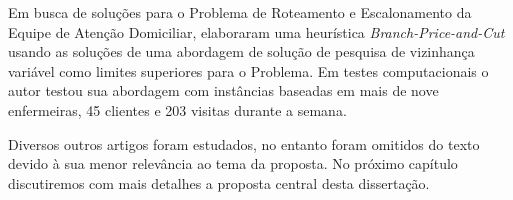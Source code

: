 


Em busca de soluções para o Problema de Roteamento e Escalonamento da Equipe de Atenção Domiciliar, \cite{trautsamwieser:2014} elaboraram uma heurística  \textit{Branch-Price-and-Cut} usando as soluções de uma abordagem de solução de pesquisa de vizinhança variável como limites superiores para o Problema. Em testes computacionais o autor testou sua abordagem com instâncias baseadas em mais de nove enfermeiras, 45 clientes e 203 visitas durante a semana.

Diversos outros artigos foram estudados, no entanto foram omitidos do texto devido à sua menor relevância ao tema da proposta. No próximo capítulo discutiremos com mais detalhes a proposta central desta dissertação.





